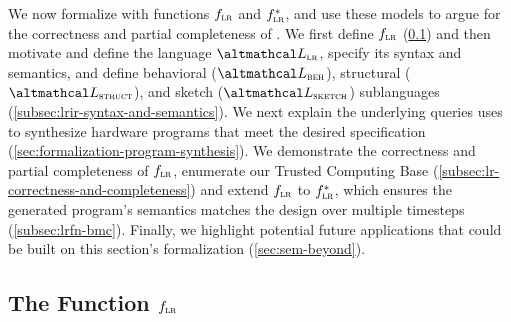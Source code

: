 We now formalize \lr{} 
  with functions $\text{$f_{\textsc{lr}}$}$ and
  $\text{$f_{\textsc{lr}}^{*}$}$,
  and use these models
  to argue for the correctness
  and partial completeness of \lr{}. 
We first define  
  $\text{$f_{\textsc{lr}}$}$ (\cref{subsec:the-lr-function}) and then 
motivate and define
  the language $\UberLang{}$,  
  specify its syntax and semantics,
  and define behavioral ($\SpecLang$), structural ($\ImplLang$), and sketch ($\SketchLang$) sublanguages (\cref{subsec:lrir-syntax-and-semantics}).
%
{%
We next explain the
  underlying queries
  \lr{} uses to
  synthesize hardware programs
  that meet the desired specification
} (\cref{sec:formalization-program-synthesis}).
  We demonstrate the correctness
  and partial completeness of $\text{$f_{\textsc{lr}}$}$,
  enumerate our Trusted Computing Base
  (\cref{subsec:lr-correctness-and-completeness}) and 
extend $\text{$f_{\textsc{lr}}$}$ to $\text{$f_{\textsc{lr}}^{*}$}$,
    which ensures the generated program's
    semantics matches the design over multiple
    timesteps (\cref{subsec:lrfn-bmc}).
%
Finally,
 we highlight potential future
 applications that could be
 built on this section's formalization
 (\cref{sec:sem-beyond}).
 

\subsection{The \lr Function $\text{$f_{\textsc{lr}}$}$}
\label{subsec:the-lr-function}

